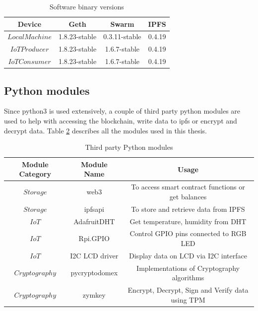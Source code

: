 \documentclass[11pt,openright]{report}
\begin{document}
\begin{table}[!htbp]
	\renewcommand{\arraystretch}{1}
	\caption{Software binary versions}
	\label{software_version}
	\centering
	\begin{tabular}{|c|c|c|c|}
		\hline
		\bfseries Device & \bfseries Geth & \bfseries Swarm  & \bfseries IPFS\\
		\hline\hline
		$Local Machine$ & 1.8.23-stable & 0.3.11-stable & 0.4.19 \\ \hline
		$IoT Producer$ & 1.8.23-stable & 1.6.7-stable & 0.4.19 \\ \hline
		$IoT Consumer$ & 1.8.23-stable & 1.6.7-stable & 0.4.19 \\ \hline
	\end{tabular}
\end{table}

\subsection{Python modules}
Since python3 is used extensively, a couple of third party python modules are used to help with accessing the blockchain, write data to ipfs or encrypt and decrypt data. Table \ref{python_modules} describes all the modules used in this thesis.
\begin{table}[!htbp]
	\renewcommand{\arraystretch}{1.3}
	\caption{Third party Python modules}
	\label{python_modules}
	\centering
	\begin{tabular}{|c|c|c|}
		\hline
		\bfseries Module Category & \bfseries Module Name & \bfseries Usage \\
		\hline\hline
		$Storage$ & web3 & To access smart contract functions or get balances \\ \hline
		$Storage$ & ipfsapi & To store and retrieve data from IPFS \\ \hline
		$IoT$ & AdafruitDHT & Get temperature, humidity from DHT \\ \hline
		$IoT$ & Rpi.GPIO & Control GPIO pins connected to RGB LED \\ \hline
		$IoT$ & I2C LCD driver & Display data on LCD via I2C interface \\ \hline
		$Cryptography$ & pycryptodomex & Implementations of Cryptography algorithms \\ \hline
		$Cryptography$ & zymkey & Encrypt, Decrypt, Sign and Verify data using TPM \\ \hline
	\end{tabular}
\end{table}
\end{document}
